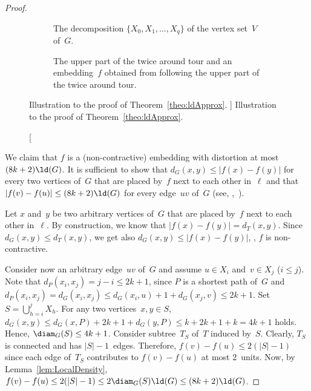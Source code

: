 \begin{proof}
\begin{figure}
    [htb]
    \centering
    \begin{subfigure}[t]{0.45\textwidth}
        \centering
        
        \caption
        {%
            The decomposition $\{ X_0, X_1, \ldots, X_q \}$ of the vertex set~$V$ of~$G$.
        }
        \label{fig:mespApprox_tree}
    \end{subfigure}
    \hfil
    \begin{subfigure}[t]{0.45\textwidth}
        \centering
        
        \caption
        {%
            The upper part of the twice around tour and an embedding~$f$ obtained from following the upper part of the twice around tour.
        }
        \label{fig:mespApprox_embedding}
    \end{subfigure}
    \caption
    [%
        Illustration to the proof of Theorem~\ref{theo:ldApprox}.
    ]
    {%
        Illustration to the proof of Theorem~\ref{theo:ldApprox}.
    }
    \label{fig:ld-vs-pb1}
\end{figure}

We claim that $f$ is a (non-contractive) embedding with distortion at most~$(8k + 2) \ld(G)$.
It is sufficient to show that $d_G(x, y) \leq |f(x) - f(y)|$ for every two vertices of~$G$ that are placed by~$f$ next to each other in~$\ell$ and that $|f(v) - f(u)| \leq (8k + 2) \ld(G)$ for every edge~$uv$ of~$G$ (see, \eg,~\cite{BadDhaGupRab2005,HeggMeisPros2011}).

Let $x$ and~$y$ be two arbitrary vertices of~$G$ that are placed by~$f$ next to each other in~$\ell$.
By construction, we know that $|f(x) - f(y)| = d_T(x, y)$.
Since $d_G(x, y) \leq d_T(x, y)$, we get also $d_G(x, y) \leq |f(x) - f(y)|$, \ie, $f$ is non-contractive.

Consider now an arbitrary edge~$uv$ of~$G$ and assume $u \in X_i$ and~$v \in X_j$ ($i \leq j$).
Note that $d_P(x_i, x_j) = j - i \leq 2k + 1$, since $P$ is a shortest path of~$G$ and $d_P(x_i, x_j) = d_G(x_i, x_j) \leq d_G(x_i, u) + 1 + d_G(x_j, v) \leq 2k + 1$.
Set $S = \bigcup_{h = i}^j X_h$.
For any two vertices~$x, y \in S$, $d_G(x,y) \leq d_G(x,P) + 2k + 1 + d_G(y, P) \leq k + 2k + 1 + k = 4k + 1$ holds.
Hence, $\diam_G(S) \leq 4k + 1$.
Consider subtree~$T_S$ of~$T$ induced by~$S$.
Clearly, $T_S$ is connected and has $|S| - 1$~edges.
Therefore, $f(v) - f(u) \leq 2(|S| - 1)$ since each edge of~$T_S$ contributes to $f(v) - f(u)$ at most 2~units.
Now, by Lemma~\ref{lem:LocalDensity}, $f(v) - f(u) \leq 2(|S| - 1) \leq 2 \diam_G(S) \ld(G) \leq (8k + 2) \ld(G)$.
\end{proof}

